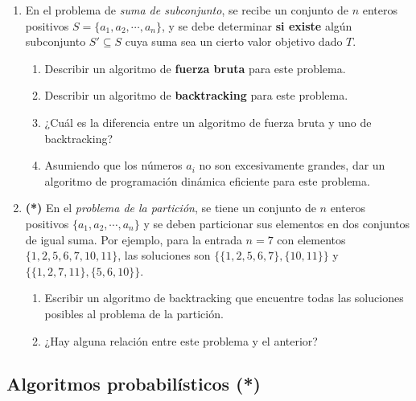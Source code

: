 \documentclass{article}
\begin{document}
    \begin{enumerate}[resume]
        \item En el problema de \textit{suma de subconjunto}, se recibe un conjunto de $n$ enteros positivos $S = \{a_1, a_2, \cdots, a_n\}$, y se debe determinar \textbf{si existe} algún subconjunto $S' \subseteq S$ cuya suma
               sea un cierto valor objetivo dado $T$.
                  \begin{enumerate}
                        \item Describir un algoritmo de \textbf{fuerza bruta} para este problema.
                        \item Describir un algoritmo de \textbf{backtracking} para este problema.
                        \item ¿Cuál es la diferencia entre un algoritmo de fuerza bruta y uno de backtracking?
                        \item Asumiendo que los números $a_i$ no son excesivamente grandes, dar un algoritmo de programación dinámica eficiente para este problema.
                  \end{enumerate}
        \item \textbf{(*)} En el \textit{problema de la partición}, se tiene un conjunto de $n$ enteros positivos $\{a_1, a_2, \cdots, a_n\}$ y se
                deben particionar sus elementos en dos conjuntos de igual suma. Por ejemplo, para la entrada $n=7$ con elementos $\{1,2,5,6,7,10,11\}$, las soluciones son $\{\{1,2,5,6,7\}, \{10,11\}\}$  y
                $\{\{1,2,7,11\}, \{5,6,10\}\}$.
                  \begin{enumerate}
                      \item Escribir un algoritmo de backtracking que encuentre todas las soluciones posibles al problema de la partición.
                      \item ¿Hay alguna relación entre este problema y el anterior?
                  \end{enumerate}
    \end{enumerate}
    
\subsection*{Algoritmos probabilísticos (*)}
    
\end{document}
